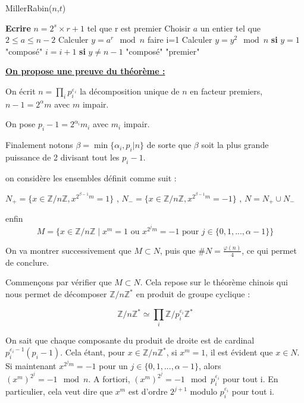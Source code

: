 \begin{algorithm}[h!]
\caption{MillerRabin($n$,$t$)}
\begin{algorithmic}[1]
\State \textbf{Ecrire} $n= 2^s \times r +1 $ tel que r est premier
\State Choisir $a$ un entier tel que $2\leq a \leq n-2$
\State Calculer  $y=a^{r} \mod n$
 faire 
\State i=1
\State Calculer $ y=y^2 \mod n$
\State \textbf{si} $y = 1$ \Return "composé"
\State $i=i+1$
\EndWhile
\State \textbf{si} $y\ne n-1$ \Return "composé"
\EndIf
\EndFor
\State \Return "premier"
\end{algorithmic}
\end{algorithm}

\clearpage
\underline{\textbf{On propose une preuve du théorème : }}

On écrit $ n = \prod_i p_i^\varepsilon^_i $ la décomposition unique de $n$ en facteur premiers, $n-1=2^\alpha m$ avec $m$ impair.

On pose $p_i-1 = 2^{\alpha_i}m_i$ avec $m_i$ impair.

Finalement notons $\beta = \min\{\alpha_i , p_i|n \}$ de sorte que $\beta$ soit 
la plus grande puissance de 2 divisant tout les $p_i-1$.

on considère les ensembles définit comme suit :
\begin{center}
    $N_+ = \{ x \in \mathbb{Z}/n\mathbb{Z} , x^{2^{\beta-1}m}={1}\}$ , $N_- = \{ x \in \mathbb{Z}/n\mathbb{Z} , x^{2^{\beta-1}m}={-1}\}$ , $N=N_+\cup N_-$
\end{center}
 
enfin $$M=\{x \in \mathbb{Z}/n\mathbb{Z}\; |\;  x^m=1 \text{ ou } x^{2^jm}=-1 \text{ pour }  j\in \{ 0,1,...,\alpha-1\} \} $$ 

On va montrer successivement que $M\subset N$, puis que $\#N=\frac{\varphi(n)}{4}$, ce qui permet de conclure.

Commençons par vérifier que $M\subset N$. Cela repose sur le théorème chinois qui nous permet de décomposer $\mathbb{Z}/n\mathbb{Z}^*$ en produit de groupe cyclique :

$$\mathbb{Z}/n\mathbb{Z}^*\simeq \prod_i \mathbb{Z}/p_i^{\varepsilon_i}\mathbb{Z}^* $$

On sait que chaque composante du produit de droite est de cardinal $p_i^{\varepsilon_i-1}(p_i-1)$.
Cela étant, pour $x\in \mathbb{Z}/n\mathbb{Z}^*$, si $x^m=1$, il est évident que $x \in N .$ Si maintenant $x^{2^j m}=-1$ pour un $j \in \{0, 1, . . . , \alpha - 1\}$,
alors $(x^m)^{2^j}=-1 \mod n$. A fortiori, $(x^m)^{2^j}=-1\mod p_i^{\varepsilon_i}$ pour tout i. En particulier, cela veut dire que $x^m$ est d'ordre $2^{j+1}$ modulo $p_i^{\varepsilon_i}$ pour tout i.


